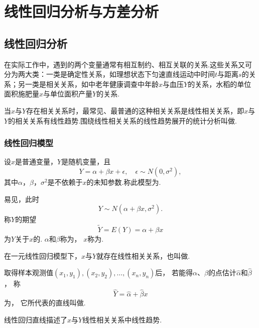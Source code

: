 \chapter{线性回归分析与方差分析}
\section{线性回归分析}
在实际工作中，遇到的两个变量通常有相互制约、相互关联的关系.这些关系又可分为两大类：一类是确定性关系，如理想状态下匀速直线运动中时间\(t\)与距离\(s\)的关系；另一类是相关关系，如中老年健康调查中年龄\(x\)与血压\(Y\)的关系，水稻的单位面积施肥量\(x\)与单位面积产量\(Y\)的关系.

当\(x\)与\(Y\)存在相关关系时，最常见、最普通的这种相关关系是线性相关关系，即\(x\)与\(Y\)的相关关系有线性趋势.围绕线性相关关系的线性趋势展开的统计分析叫做.

\subsection{线性回归模型}
\begin{definition}
设\(x\)是普通变量，\(Y\)是随机变量，且\begin{equation*}
Y = \alpha + \beta x + \epsilon,
\quad \epsilon \sim N(0,\sigma^2),
\end{equation*}其中\(\alpha\)，\(\beta\)，\(\sigma^2\)是不依赖于\(x\)的未知参数.称此模型为.

易见，此时\begin{equation*}
	Y \sim N(\alpha + \beta x,\sigma^2).
\end{equation*}
称\(Y\)的期望\begin{equation*}
	\tilde{Y} = E(Y) = \alpha + \beta x
\end{equation*}为\(Y\)关于\(x\)的.
\(\alpha\)和\(\beta\)称为，
\(x\)称为.

在一元线性回归模型下，\(x\)与\(Y\)就存在线性相关关系，也叫做.

取得样本观测值\((x_1,y_1),(x_2,y_2),\dotsc,(x_n,y_n)\)后，
若能得\(\alpha\)、\(\beta\)的点估计\(\hat{\alpha}\)和\(\hat{\beta}\)，
称\begin{equation*}
	\hat{Y} = \hat{\alpha} + \hat{\beta} x
\end{equation*}
为，
它所代表的直线叫做.
\end{definition}
线性回归直线描述了\(x\)与\(Y\)线性相关关系中线性趋势.

